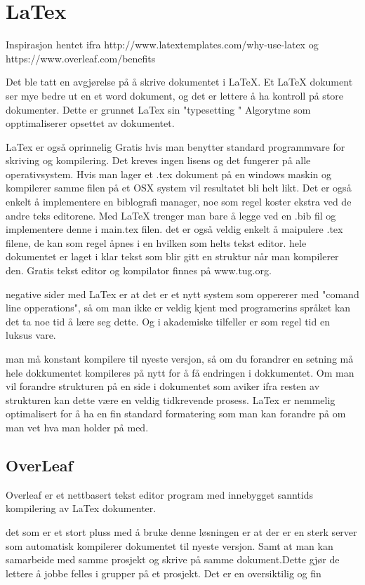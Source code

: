 \cite {Googledocs}

\newpage

\section{LaTex}

{\color{green} Inspirasjon hentet ifra http://www.latextemplates.com/why-use-latex og https://www.overleaf.com/benefits
 }

Det ble tatt en avgjørelse på å skrive dokumentet i LaTeX. Et LaTeX dokument ser mye bedre ut en et word dokument, og det er lettere å ha kontroll på store dokumenter. Dette er grunnet LaTex sin "typesetting "
Algorytme som opptimaliserer opsettet av dokumentet.

LaTex er også oprinnelig Gratis hvis man benytter standard programmvare for skriving og kompilering. Det kreves ingen lisens og det fungerer på alle operativsystem. Hvis man lager et .tex dokument på en windows maskin og kompilerer samme filen på et OSX system vil resultatet bli helt likt.
Det er også enkelt å implementere en biblografi manager, noe som regel koster ekstra ved de andre teks editorene.
Med LaTeX trenger man bare å legge ved en .bib fil og implementere denne i main.tex filen. det er også veldig enkelt å maipulere .tex filene, de kan som regel åpnes i en hvilken som helts tekst editor. hele dokumentet er laget i klar tekst som blir gitt en struktur når man kompilerer den. Gratis tekst editor og kompilator finnes på www.tug.org. 

negative sider med LaTex er at det er et nytt system som oppererer med "comand line opperations", så om man ikke er veldig kjent med programerins språket kan det ta noe tid å lære seg dette. Og i akademiske tilfeller er som regel tid en luksus vare.

man må konstant kompilere til nyeste versjon, så om du forandrer en setning må hele dokkumentet kompileres på nytt for å få endringen i dokkumentet. Om man vil forandre strukturen på en side i dokumentet som aviker ifra resten av strukturen kan dette være en veldig tidkrevende prosess.
LaTex er nemmelig optimalisert for å ha en fin standard formatering som man kan forandre på om man vet hva man holder på med.

\subsection{OverLeaf}


Overleaf er et nettbasert tekst editor program med innebygget sanntids kompilering av LaTex dokumenter.



det som er et stort pluss med å bruke denne løsningen er at der er en sterk server som automatisk kompilerer dokumentet til nyeste versjon. Samt at man kan samarbeide med samme prosjekt og skrive på samme dokument.Dette gjør de lettere å jobbe felles i grupper på et prosjekt.
Det er en oversiktilig og fin 







